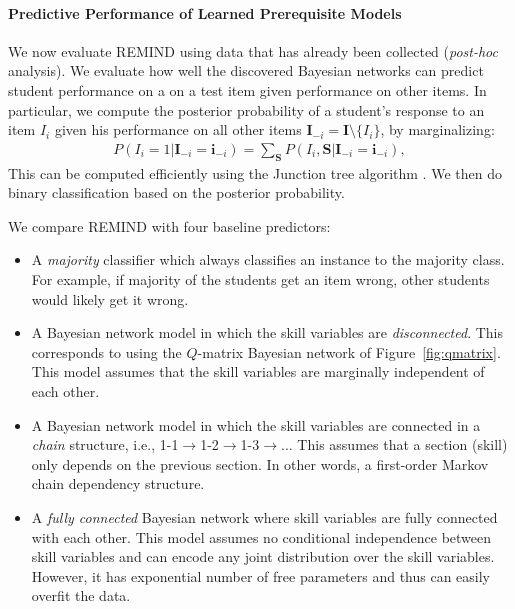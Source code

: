 \documentclass{edm_template}
\begin{document}
{	\paragraph{Predictive Performance of Learned Prerequisite Models}
	\label{sec:predictive_performance}
	
	We now evaluate  REMIND using data  that has already been collected (\textit{post-hoc} analysis). %
	We evaluate how well the discovered Bayesian networks can predict  student performance on a 
	on a test item given performance on other items.
	In particular, we compute the posterior probability of a student's response to an item $I_i$ given his performance on all other items 
	$\mathbf{I}_{-i}=\mathbf{I}\setminus\{I_i\}$, by marginalizing:
	\begin{align}
		P(I_i=1|\mathbf{I}_{-i}=\mathbf{i}_{-i}) =\sum_{\mathbf{S}}P(I_i, \mathbf{S}|\mathbf{I}_{-i}=\mathbf{i}_{-i}),
	\end{align}
	This can be computed efficiently using the Junction tree algorithm \cite{koller2009probabilistic}. 
	We then do binary classification based on the posterior probability.
	
	We compare REMIND with four baseline predictors:
	\begin{itemize}
		\item  A \emph{majority} classifier which always classifies  an instance to the majority class.
		For example, if majority of the students get an item wrong, other students would likely get it wrong.
		\item  A Bayesian network model in which the skill variables are \emph{disconnected}. 
		This corresponds to using the $Q$-matrix  Bayesian network of Figure~\ref{fig:qmatrix}.
		This model assumes that the skill variables are marginally independent of each other.
		\item A Bayesian network model in which the skill variables are connected in a \emph{chain} structure, i.e., 1-1$\rightarrow$1-2$\rightarrow$1-3$\rightarrow\dots$
		This assumes that a section (skill) only depends on the previous section.
		In other words, a first-order Markov chain dependency structure.
		\item A \emph{fully connected} Bayesian network where skill variables are fully connected with each other.
		This model assumes no conditional independence between skill variables and can encode any joint distribution over the skill variables.
		However, it has exponential number of free parameters and thus can easily overfit the data.
	\end{itemize}
	
}
\end{document}
